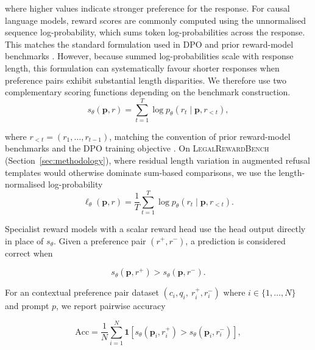 \documentclass{article}
\theoremstyle{plain}
\theoremstyle{definition}
\theoremstyle{remark}
\begin{document}
where higher values indicate stronger preference for the response. For causal language models, reward scores are commonly computed using the unnormalised sequence log-probability, which sums token log-probabilities across the response. This matches the standard formulation used in DPO and prior reward-model benchmarks \citep{rafailov2023direct,lambert-etal-2025-rewardbench,xu-etal-2025-context}. However, because summed log-probabilities scale with response length, this formulation can systematically favour shorter responses when preference pairs exhibit substantial length disparities. We therefore use two complementary scoring functions depending on the benchmark construction.
\begin{equation}
s_\theta(\mathbf{p}, r)
=
\sum_{t=1}^{T}
\log p_\theta(r_t \mid \mathbf{p}, r_{<t}),
\label{eq:sequence_logprob}
\end{equation}

where $r_{<t} = (r_1,\dots,r_{t-1})$, matching the convention of prior reward-model benchmarks and the DPO training objective \citep{rafailov2023direct,lambert-etal-2025-rewardbench,xu-etal-2025-context}. On \textsc{LegalRewardBench} (Section~\ref{sec:methodology}), where residual length variation in augmented refusal templates would otherwise dominate sum-based comparisons, we use the length-normalised log-probability
\begin{equation}
\ell_\theta(\mathbf{p}, r)
=
\frac{1}{T}
\sum_{t=1}^{T}
\log p_\theta(r_t \mid \mathbf{p}, r_{<t}).
\label{eq:length_norm_logprob}
\end{equation}

Specialist reward models with a scalar reward head use the head output directly in place of $s_\theta$. Given a preference pair $(r^{+}, r^{-})$, a prediction is considered correct when

\begin{equation}
s_\theta(\mathbf{p}, r^{+})
>
s_\theta(\mathbf{p}, r^{-}).
\label{eq:pairwise_decision}
\end{equation}

For an contextual preference pair dataset
$
(c_i, q_i, \ r_i^{+}, r_i^{-})$ where $i \in \{1, \dots, N\}$ and prompt $p$, we report pairwise accuracy

\begin{equation}
\mathrm{Acc}
=
\frac{1}{N}
\sum_{i=1}^{N}
\mathbf{1}
\left[
s_\theta(\mathbf{p}_i, r_i^{+})
>
s_\theta(\mathbf{p}_i, r_i^{-})
\right],
\label{eq:pairwise_accuracy}
\end{equation}
\end{document}
